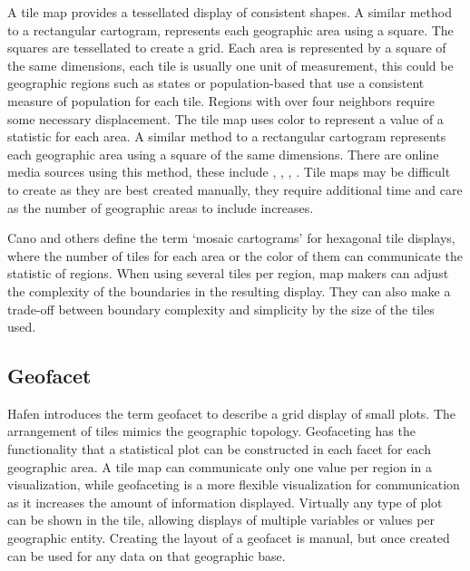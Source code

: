 \documentclass{monashthesis}
\begin{document}
A tile map provides a tessellated display of consistent shapes. A similar method to a rectangular cartogram, represents each geographic area using a square. The squares are tessellated to create a grid. Each area is represented by a square of the same dimensions, each tile is usually one unit of measurement, this could be geographic regions such as states or population-based that use a consistent measure of population for each tile. Regions with over four neighbors require some necessary displacement. The tile map uses color to represent a value of a statistic for each area. A similar method to a rectangular cartogram represents each geographic area using a square of the same dimensions. There are online media sources using this method, these include \autocite{NPR}, \autocite{FiveThirtyEight}, \autocite{WSJ}, \autocite{WP}. Tile maps may be difficult to create as they are best created manually, they require additional time and care as the number of geographic areas to include increases.

Cano and others \autocite{MDAC} define the term `mosaic cartograms' for hexagonal tile displays, where the number of tiles for each area or the color of them can communicate the statistic of regions. When using several tiles per region, map makers can adjust the complexity of the boundaries in the resulting display. They can also make a trade-off between boundary complexity and simplicity by the size of the tiles used.

\hypertarget{geofacet}{%
\subsection{Geofacet}\label{geofacet}}

Hafen \autocite{IGF} introduces the term geofacet to describe a grid display of small plots. The arrangement of tiles mimics the geographic topology. Geofaceting has the functionality that a statistical plot can be constructed in each facet for each geographic area. A tile map can communicate only one value per region in a visualization, while geofaceting is a more flexible visualization for communication as it increases the amount of information displayed. Virtually any type of plot can be shown in the tile, allowing displays of multiple variables or values per geographic entity. Creating the layout of a geofacet is manual, but once created can be used for any data on that geographic base.
\end{document}
